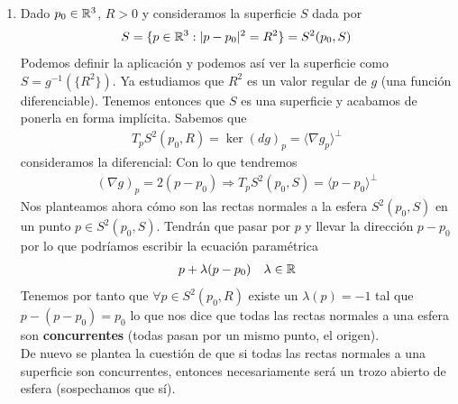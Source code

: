 \begin{ejemplo}
\begin{enumerate}
\begin{enumerate}
            De esta forma hemos probado que todas las rectas normales a un plano son paralelas. Esto deja abierta la pregunta de si una superficie con todas sus rectas normales paralelas es necesariamente un plano (o un trozo abierto de plano). Probablemente esto sea verdad.
        \end{enumerate}
        \item Dado $p_0\in \mathbb{R}^3$, $R>0$ y consideramos la superficie $S$ dada por 
        \begin{gather*}
            S = \{p\in \mathbb{R}^3 : |p-p_0|^2 = R^2\} = S^2(p_0, S)
        \end{gather*}
        Podemos definir la aplicación 
        y podemos así ver la superficie como $S=g^{-1}(\{R^2\})$. Ya estudiamos que $R^2$ es un valor regular de $g$ (una función diferenciable). Tenemos entonces que $S$ es una superficie y acabamos de ponerla en forma implícita. Sabemos que 
        \begin{gather*}
            T_pS^2(p_0, R) = \ker(dg)_p = \langle \nabla g_p \rangle^{\bot}
        \end{gather*}
        consideramos la diferencial:
        Con lo que tendremos 
        \begin{gather*}
            (\nabla g)_p = 2(p-p_0) \Rightarrow T_pS^2(p_0, S) = \langle p-p_0\rangle ^{\bot}
        \end{gather*}
        Nos planteamos ahora cómo son las rectas normales a la esfera $S^2(p_0, S)$ en un punto $p\in S^2(p_0, S)$. Tendrán que pasar por $p$ y llevar la dirección $p-p_0$ por lo que podríamos escribir la ecuación paramétrica
        \begin{gather*}
            p+ \lambda (p-p_0) \ \ \ \lambda \in \mathbb{R}
        \end{gather*}
        Tenemos por tanto que $\forall p \in S^2(p_0, R)$ existe un $\lambda(p)=-1$ tal que $p-(p-p_0) = p_0$ lo que nos dice que todas las rectas normales a una esfera son \textbf{concurrentes} (todas pasan por un mismo punto, el origen). \\

        De nuevo se plantea la cuestión de que si todas las rectas normales a una superficie son concurrentes, entonces necesariamente será un trozo abierto de esfera (sospechamos que sí).


\end{enumerate}
\end{ejemplo}
